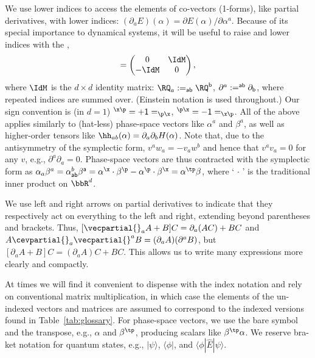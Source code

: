 \documentclass{article}
\numberwithin{equation}{section}
\begin{document}
We use lower indices to access the elements of co-vectors (1-forms), like partial derivatives, with lower indices: $(\partial_a E)(\alpha)= \partial E(\alpha)/\partial \alpha^a$. 
Because of its special importance to dynamical systems, it will be useful to raise and lower indices with the ,
\begin{align}\label{eq:symplectic-form}
    \sf =
    \left(\begin{matrix} 0 & \IdM \\ -\IdM & 0 \end{matrix} \right),
\end{align}
where $\IdM$ is the $d\times d$ identity matrix: $\RQ_a := \sf_{ab}\RQ^b$, $\partial^a := \sf^{ab}\partial_b$, where repeated indices are summed over. (Einstein notation is used throughout.) Our sign convention is (in $d=1$) $\sf^{\x\p} = +1 = \sf_{\p\x}$, $\sf^{\p\x} = -1 = \sf_{\x\p}$. All of the above applies similarly to (hat-less) phase-space vectors like $\alpha^a$ and $\beta^a$, as well as higher-order tensors like $\hh_{ab}(\alpha) = \partial_a \partial_b H(\alpha)$.  Note that, due to the antisymmetry of the symplectic form, $v^a w_a = - v_a w^b$ and hence that $v^a v_a = 0$ for any $v$, e.g., $\partial^a \partial_a = 0$.  
Phase-space vectors are thus contracted with the symplectic form as $\alpha_a\beta^a = \alpha^b \sf_{ab} \beta^a = \alpha^\x \cdot \beta^\p - \alpha^\p \cdot \beta^\x = \alpha^\tp \sf \beta $, where `$\,\cdot\,$' is the traditional inner product on $\bbR^{d}$.

We use left and right arrows on partial derivatives to indicate that they respectively act on everything to the left and right, extending beyond parentheses and brackets. Thus, $[\vecpartial{}_a A+B]C = \partial_a(AC)+BC$ and $A\cevpartial{}_a\vecpartial{}^a B = (\partial_a A)(\partial^a B)$, but $[\partial_a A + B]C = (\partial_a A)C+BC$. This allows us to write many expressions more clearly and compactly.

At times we will find it convenient to dispense with the index notation and rely on conventional matrix multiplication, in which case the elements of the un-indexed vectors and matrices are assumed to correspond to the indexed versions found in Table~\ref{tab:glossary}.
For phase-space vectors, we use the bare symbol and the transpose, e.g., $\alpha$ and $\beta^\tp$, producing scalars like $\beta^\tp \sf \alpha$. We reserve bra-ket notation for quantum states, e.g., $|\psi\rangle$, $\langle\phi|$, and $\langle\phi|\hat{E}|\psi\rangle$.
\end{document}

